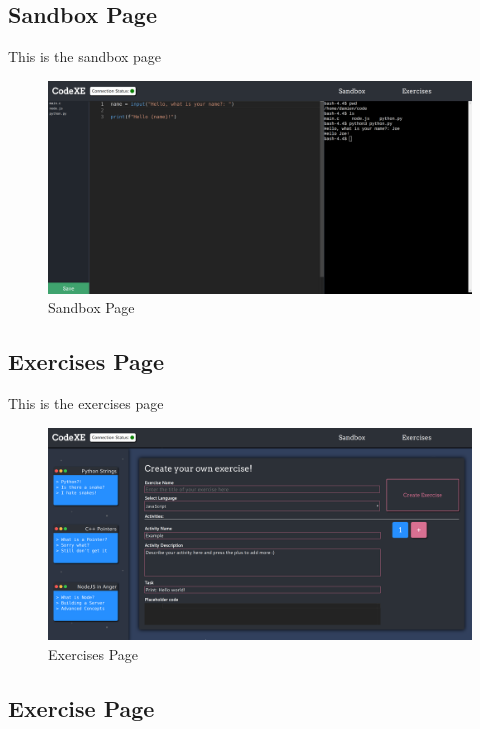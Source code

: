 \subsection{Sandbox Page}

This is the sandbox page

\begin{figure}[h!]
    \centering
    \includegraphics[width=\linewidth]{res/sandbox_page.png}
    \caption{Sandbox Page}
    \label{fig:sandboxpage}
\end{figure}

\subsection{Exercises Page}

This is the exercises page

\begin{figure}[h!]
    \centering
    \includegraphics[width=\linewidth]{res/exercises_page.png}
    \caption{Exercises Page}
    \label{fig:exercisespage}
\end{figure}

\subsection{Exercise Page}

